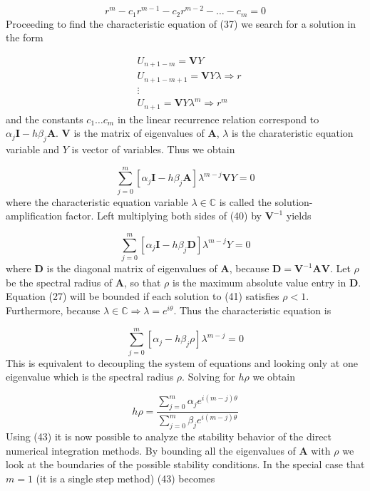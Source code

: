 \documentclass{article}
\begin{document}
				\begin{equation}
					 r^m - c_1r^{m-1} - c_2r^{m-2} - \dots - c_m = 0
				\end{equation}
Proceeding to find the characteristic equation of (37) we search for a solution in the form

				\begin{align*}
					& U_{n+1 - m} = \textbf{V}Y \\
					& U_{n+1 - m+1} = \textbf{V}Y\lambda \Rightarrow r\\
					&\vdots \\
					& U_{n+1} = \textbf{V}Y\lambda^{m} \Rightarrow r^{m}
				\end{align*}
and the constants $c_1 \dots c_m$ in the linear recurrence relation correspond to $\alpha_j\textbf{I} - h\beta_j\textbf{A}$. $\textbf{V}$ is the matrix of eigenvalues of $\textbf{A}$,  $\lambda$ is the charateristic equation variable and $Y$ is vector of variables. Thus we obtain

				\begin{equation}
					\sum_{j=0}^{m} \left[\alpha_j\textbf{I} - h\beta_j\textbf{A}\right]\lambda^{m-j}\textbf{V}Y = 0
				\end{equation}
where the characteristic equation variable $\lambda \in \mathbb{C}$ is called the solution-amplification factor. Left multiplying both sides of (40) by $\textbf{V}^{-1}$ yields

				\begin{equation}
					\sum_{j=0}^{m} \left[\alpha_j\textbf{I} - h\beta_j\textbf{D}\right]\lambda^{m-j}Y = 0
				\end{equation}
where $\textbf{D}$ is the diagonal matrix of eigenvalues of $\textbf{A}$, because $\textbf{D} = \textbf{V}^{-1}\textbf{A}\textbf{V}$. Let $\rho$ be the spectral radius of $\textbf{A}$, so that $\rho$ is the maximum absolute value entry in $\textbf{D}$. Equation (27) will be bounded if each solution to (41) satisfies $\rho < 1$. Furthermore, because $\lambda \in \mathbb{C} \Rightarrow \lambda = e^{i\theta}$. Thus the characteristic equation is

				\begin{equation}
					\sum_{j=0}^{m} \left[\alpha_j - h\beta_j\rho\right]\lambda^{m-j} = 0
				\end{equation}
This is equivalent to decoupling the system of equations and looking only at one eigenvalue which is the spectral radius $\rho$. Solving for $h\rho$ we obtain 

				\begin{equation}
					 h\rho = \frac{\sum_{j=0}^{m}\alpha_je^{i(m-j)\theta}}{ \sum_{j=0}^{m}\beta_je^{i(m-j)\theta}}
				\end{equation}
Using (43) it is now possible to analyze the stability behavior of the direct numerical integration methods. By bounding all the eigenvalues of $\textbf{A}$ with $\rho$ we look at the boundaries of the possible stability conditions. In the special case that $m=1$ (it is a single step method) (43) becomes
\end{document}
